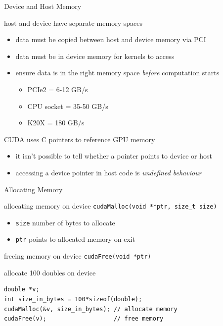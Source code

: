 \documentclass[aspectratio=43]{beamer}
\newcommand{\lst}[1]{\colorbox{white!90!blue}{\lstinline!#1!}}
\begin{document}
\begin{frame}[fragile]{Device and Host Memory}
    \begin{info}{host and device have separate memory spaces}
        \begin{itemize}
            \item data must be copied between host and device memory via PCI
            \item data must be in device memory for kernels to access
            \item ensure data is in the right memory space \emph{before} computation starts
                \begin{itemize}
                    \item PCIe2 = 6-12 GB/s
                    \item CPU socket = 35-50 GB/s
                    \item K20X  = 180 GB/s
                \end{itemize}
        \end{itemize}
    \end{info}

    \begin{info}{CUDA uses C pointers to reference GPU memory}
        \begin{itemize}
            \item it isn't possible to tell whether a pointer points to device or host
            \item accessing a device pointer in host code is \emph{undefined behaviour}
        \end{itemize}
    \end{info}

\end{frame}

\begin{frame}[fragile]{Allocating Memory}

    \begin{info}{allocating memory on device}
        \centering \lst{cudaMalloc(void **ptr, size_t size)}
    \begin{itemize}
        \item \lst{size} number of bytes to allocate
        \item \lst{ptr} points to allocated memory on exit
    \end{itemize}
    \end{info}

    \begin{info}{freeing memory on device}
        \centering \lst{cudaFree(void *ptr)}
    \end{info}

    \begin{code}{allocate 100 doubles on device}
        \begin{lstlisting}[style=boxcuda]
double *v;
int size_in_bytes = 100*sizeof(double);
cudaMalloc(&v, size_in_bytes); // allocate memory
cudaFree(v);                   // free memory
\end{lstlisting}
    \end{code}
\end{frame}
\end{document}
